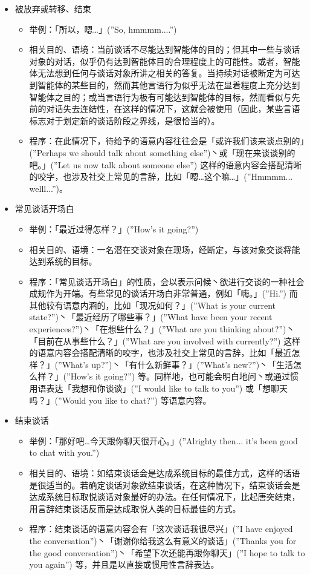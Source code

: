 \begin{itemize}
\item 被放弃或转移、结束
\begin{itemize}
  \item 举例：「所以，嗯…」(”So, hmmmm....”)
  \item 相关目的、语境：当前谈话不尽能达到智能体的目的；但其中一些与谈话对象的对话，似乎仍有达到智能体目的合理程度上的可能性。或者，智能体无法想到任何与谈话对象所讲之相关的答复。当持续对话被断定为可达到智能体的某些目的，然而其他言语行为似乎无法在显着程度上充分达到智能体之目的；或当言语行为极有可能达到智能体的目标，然而看似与先前的对话失去连结性，在这样的情况下，这就会被使用（因此，某些言语标志对于划定新的谈话阶段之界线，是很恰当的）。
  \item 程序：在此情况下，待给予的语意内容往往会是「或许我们该来谈点别的」(”Perhaps we should talk about something else”)丶或「现在来谈谈别的吧。」(”Let us now talk about someone else”) 这样的语意内容会搭配清晰的咬字，也涉及社交上常见的言辞，比如「嗯…这个嘛…」(”Hmmmm... welll...”)。
\end{itemize}
\item 常见谈话开场白
  \begin{itemize}
  \item 举例：「最近过得怎样？」(”How’s it going?”)
  \item 相关目的、语境：一名潜在交谈对象在现场，经断定，与该对象交谈将能达到系统的目标。
  \item 程序：「常见谈话开场白」的性质，会以表示问候丶欲进行交谈的一种社会成规作为开端。有些常见的谈话开场白非常普通，例如「嗨。」(”Hi.”) 而其他较有语意内涵的，比如「现况如何？」(”What is your current state?”)丶「最近经历了哪些事？」(”What have been your recent experiences?”)丶「在想些什么？」(”What are you thinking about?”)丶「目前在从事些什么？」(”What are you involved with currently?”) 这样的语意内容会搭配清晰的咬字，也涉及社交上常见的言辞，比如「最近怎样？」(”What’s up?”)丶「有什么新鲜事？」(”What’s new?”)丶「生活怎么样？」(”How’s it going?”) 等。同样地，也可能会明白地问丶或通过惯用语表达「我想和你谈谈」(”I would like to talk to you”) 或「想聊天吗？」(”Would you like to chat?”) 等语意内容。 
  \end{itemize}
\item 结束谈话
  \begin{itemize}
  \item 举例：「那好吧…今天跟你聊天很开心。」(”Alrighty then... it’s been good to chat with you.”)
  \item 相关目的、语境：如结束谈话会是达成系统目标的最佳方式，这样的话语是很适当的。若确定谈话对象欲结束谈话，在这种情况下，结束谈话会是达成系统目标取悦谈话对象最好的办法。在任何情况下，比起唐突结束，用言辞结束谈话反而是达成取悦人类的目标最佳的方式。
  \item 程序：结束谈话的语意内容会有「这次谈话我很尽兴」(”I have enjoyed the conversation”)丶「谢谢你给我这么有意义的谈话」(”Thanks you for the good conversation”)丶「希望下次还能再跟你聊天」(”I hope to talk to you again”) 等，并且是以直接或惯用性言辞表达。
  \end{itemize}
\end{itemize}

